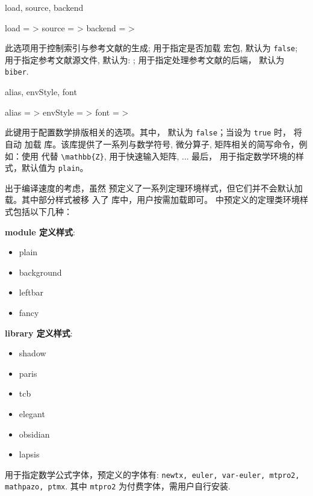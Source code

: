 \begin{keyval}[updated=2024-12-05, parent=ztex/bib_index]{load, source, backend}
  \begin{syntax}
    load    = >
    source  = >
    backend = >
  \end{syntax}
  此选项用于控制索引与参考文献的生成;  用于指定是否加载  宏包, 默认为 \texttt{false}; 
   用于指定参考文献源文件, 默认为: ;  用于指定处理参考文献的后端，
  默认为\texttt{biber}.
\end{keyval}


\begin{keyval}[updated=2024-11-05, parent=ztex/mathSpec]{alias, envStyle, font}
  \begin{syntax}
    alias    = >
    envStyle = >
    font     = >
  \end{syntax}
  此键用于配置数学排版相关的选项。其中， 默认为 \texttt{false}；当设为 \texttt{true} 时，\ztex{} 将自动
  加载  库。该库提供了一系列与数学符号, 微分算子, 矩阵相关的简写命令，例如：使用 \cmd{\ZZ} 代替 \verb|\mathbb{Z}|,
   用于快速输入矩阵, ... 最后， 用于指定数学环境的样式，默认值为 \texttt{plain}。
\end{keyval}

出于编译速度的考虑，虽然 \ztex{} 预定义了一系列定理环境样式，但它们并不会默认加载。其中部分样式被移
入了  库中，用户按需加载即可。\ztex{} 中预定义的定理类环境样式包括以下几种：

\noindent\parbox[t]{.5\linewidth}{
\noindent \textbf{ module 定义样式}:
\begin{itemize}
  \item plain 
  \item background
  \item leftbar 
  \item fancy 
\end{itemize}}%
\parbox[t]{.5\linewidth}{
\noindent \textbf{ library 定义样式}:
\begin{itemize}
  \item shadow
  \item paris 
  \item tcb
  \item elegant
  \item obsidian
  \item lapsis
\end{itemize}}

 用于指定数学公式字体，预定义的字体有: \texttt{newtx, euler, var-euler, mtpro2, mathpazo, ptmx}. 
其中 \texttt{mtpro2} 为付费字体，需用户自行安装.
